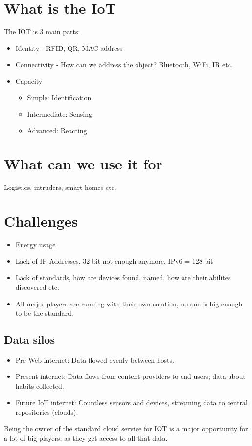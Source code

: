 	\section{What is the IoT}
	The \gls{IOT} is 3 main parts:
	
	\begin{itemize}
		\item Identity - RFID, QR, MAC-address
		\item Connectivity - How can we address the object? Bluetooth, WiFi, IR etc.
		\item Capacity
		\begin{itemize}
			\item Simple: Identification
			\item Intermediate: Sensing
			\item Advanced: Reacting
		\end{itemize}
	\end{itemize}
	
	\section{What can we use it for}
	Logistics, intruders, smart homes etc.
	
	\section{Challenges}
	\begin{itemize}
		\item Energy usage
		\item Lack of IP Addresses. 32 bit not enough anymore, IPv6 = 128 bit
		\item Lack of standards, how are devices found, named, how are their abilites discovered etc.
		\item All major players are running with their own solution, no one is big enough to be the standard.
	\end{itemize}
	
	\subsection{Data silos}
	\begin{itemize}
		\item Pre-Web internet: Data flowed evenly between hosts.
		\item Present internet: Data flows from content-providers to end-users; data about habits collected.
		\item Future IoT internet: Countless sensors and devices, streaming data to central repositories (clouds).
	\end{itemize}
	Being the owner of the standard cloud service for \gls{IOT} is a major opportunity for a lot of big players, as they get access to all that data.
	
